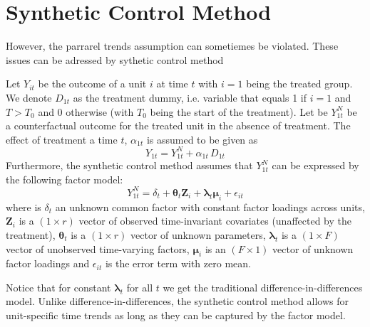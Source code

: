 \section{Synthetic Control Method}
However, the parrarel trends assumption can sometiemes be violated. These issues can be adressed by sythetic control method
\citep{abadie_economic_2003, abadie_synthetic_2010}

Let $Y_{it}$ be the outcome of a unit $i$ at time $t$ with $i = 1$ being the treated group.  We
denote $D_{1t}$ as the treatment dummy, i.e. variable that equals 1 if $i = 1$ and $T > T_0$ and 0 otherwise (with $T_0$ being the start of the treatment). 
Let be $Y_{1t}^N$ be a counterfactual outcome for the treated unit in the absence of treatment. The effect of treatment a time $t$, $\alpha_{1t}$ is assumed to be given as 
\begin{equation}
    Y_{1t} = Y_{1t}^N + \alpha_{1t} \, D_{1t}
\end{equation}
Furthermore, the synthetic control method assumes that $Y_{1t}^N$  can be expressed by the following factor model:
\begin{equation}
   Y_{1t}^N = \delta_t + \boldsymbol{\theta}_t \boldsymbol{Z}_i +
   \boldsymbol{\lambda}_t \boldsymbol{\mu}_i + \epsilon_{it}
\end{equation}
where is $\delta_t$ an unknown common factor with constant factor
loadings across units, $\boldsymbol{Z}_i$ is a
$(1 \times r)$ vector of observed time-invariant covariates (unaffected by the treatment),  $\boldsymbol{\theta}_t$ is a $(1 \times r)$ vector of
unknown parameters, $\boldsymbol{\lambda}_t$ is a $(1 \times F)$ vector of unobserved time-varying factors, $\boldsymbol{\mu}_i$ is an $(F \times 1)$ vector of unknown factor loadings
and $\epsilon_{it}$ is the error term with zero mean.

Notice that for constant  $\boldsymbol{\lambda}_t$ for all $t$ we get the traditional  difference-in-differences model. Unlike difference-in-differences,  the synthetic control method  allows for unit-specific time trends as long as they can be captured by the factor model. 

